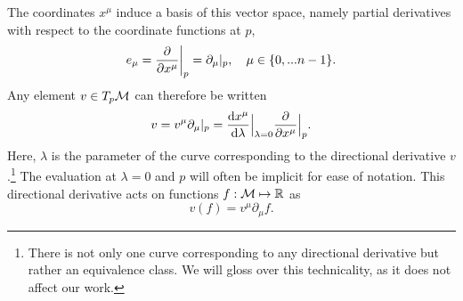 The coordinates $x^\mu$ induce a basis of this vector space, namely partial derivatives with respect to the coordinate functions at $p$,
%
\begin{equation}
    e_\mu = \pdv{}{x^\mu} \bigg|_p = \partial_\mu|_p, \quad \mu \in \{0, ... n-1\}.
\end{equation}
%
Any element $v \in T_p \mathcal M$ can therefore be written
%
\begin{equation}
    v = v^\mu \partial_\mu |_p = \odv{x^\mu}{\lambda}\Big |_{\lambda = 0} \pdv{}{x^\mu}\Big |_p.
\end{equation}
%
Here, $\lambda$ is the parameter of the curve corresponding to the directional derivative $v$.\footnote{%
There is not only one curve corresponding to any directional derivative but rather an equivalence class. We will gloss over this technicality, as it does not affect our work.
}
The evaluation at $\lambda = 0$ and $p$ will often be implicit for ease of notation.
This directional derivative acts on functions $f : \mathcal M \mapsto \mathbb R$ as
%
\begin{equation}
    v(f) = v^\mu \partial_\mu f.
\end{equation}
%




